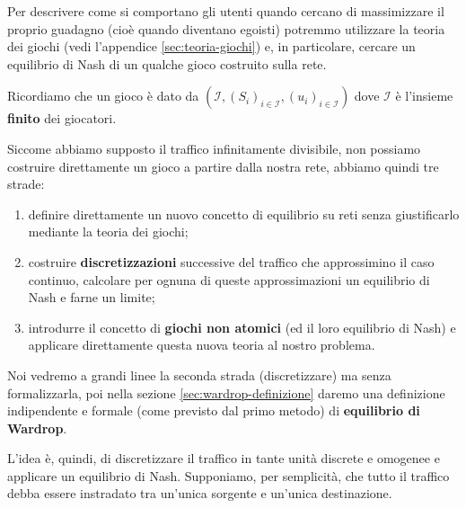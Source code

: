 \documentclass[a4paper]{article}
\theoremstyle{plain}
\theoremstyle{definition}
\theoremstyle{remark}
\newcommand{\pa}[1]{\left(#1\right)}
\begin{document}
Per descrivere come si comportano gli utenti quando cercano di
massimizzare il proprio guadagno (cioè quando diventano egoisti)
potremmo utilizzare la teoria dei giochi (vedi l'appendice
\ref{sec:teoria-giochi}) e, in particolare, cercare un equilibrio di
Nash di un qualche gioco costruito sulla rete.

Ricordiamo che un gioco è dato da
$\pa{\mathcal{I}, \pa{S_i}_{i\in\mathcal{I}},
  \pa{u_i}_{i\in\mathcal{I}}}$ dove $\mathcal{I}$ è l'insieme
\textbf{finito} dei giocatori.

Siccome abbiamo supposto il traffico infinitamente divisibile, non
possiamo costruire direttamente un gioco a partire dalla nostra rete,
abbiamo quindi tre strade:
\begin{enumerate}
\item definire direttamente un nuovo concetto di equilibrio su reti
  senza giustificarlo mediante la teoria dei giochi;
\item costruire \textbf{discretizzazioni} successive del traffico che
  approssimino il caso continuo, calcolare per ognuna di queste
  approssimazioni un equilibrio di Nash e farne un limite;
\item introdurre il concetto di \textbf{giochi non atomici} (ed il
  loro equilibrio di Nash) e applicare direttamente questa nuova
  teoria al nostro problema.
\end{enumerate}

Noi vedremo a grandi linee la seconda strada (discretizzare) ma senza
formalizzarla, poi nella sezione \ref{sec:wardrop-definizione} daremo
una definizione indipendente e formale (come previsto dal primo
metodo) di \textbf{equilibrio di Wardrop}.

L'idea è, quindi, di discretizzare il traffico in tante unità discrete
e omogenee e applicare un equilibrio di Nash. Supponiamo, per
semplicità, che tutto il traffico debba essere instradato tra un'unica
sorgente e un'unica destinazione.
\end{document}
